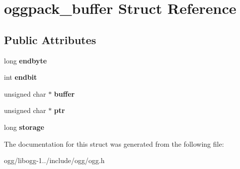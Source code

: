 \hypertarget{structoggpack__buffer}{\section{oggpack\+\_\+buffer Struct Reference}
\label{structoggpack__buffer}
}
\subsection*{Public Attributes}
\begin{DoxyCompactItemize}
\item 
\hypertarget{structoggpack__buffer_a416200dd77da3603dce3913826d74207}{long {\bfseries endbyte}}\label{structoggpack__buffer_a416200dd77da3603dce3913826d74207}

\item 
\hypertarget{structoggpack__buffer_a5a2ecb260025f73201e58dbd621c9f8b}{int {\bfseries endbit}}\label{structoggpack__buffer_a5a2ecb260025f73201e58dbd621c9f8b}

\item 
\hypertarget{structoggpack__buffer_aea4c2d57891d2baf710d3ae6d0bf0d57}{unsigned char $\ast$ {\bfseries buffer}}\label{structoggpack__buffer_aea4c2d57891d2baf710d3ae6d0bf0d57}

\item 
\hypertarget{structoggpack__buffer_aeea0f14b14eadc508b47e9da1dcc7a32}{unsigned char $\ast$ {\bfseries ptr}}\label{structoggpack__buffer_aeea0f14b14eadc508b47e9da1dcc7a32}

\item 
\hypertarget{structoggpack__buffer_a1eea2afb662c8080a902d224773fee4e}{long {\bfseries storage}}\label{structoggpack__buffer_a1eea2afb662c8080a902d224773fee4e}

\end{DoxyCompactItemize}


The documentation for this struct was generated from the following file\+:\begin{DoxyCompactItemize}
\item 
ogg/libogg-\/1../include/ogg/ogg.\+h\end{DoxyCompactItemize}
